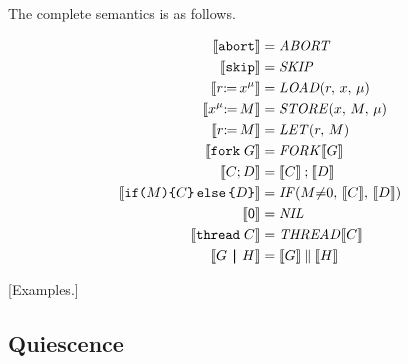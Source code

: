 The complete semantics is as follows.
\begin{scope}
  \allowdisplaybreaks
  \begin{align*}
    \sem{\ABORT} &= \sABORT
    \\
    \sem{\SKIP} &= \sSKIP
    \\
    \sem{\PR[\amode]{\aLoc}{\aReg}} &= \sLOAD[\amode]{\aReg}{\aLoc}
    \\
    \sem{\PW[\amode]{\aLoc}{\aExp}} &= \sSTORE[\amode]{\aLoc}{\aExp}
    \\
    \sem{\LET{\aReg}{\aExp}} &= \sLET{\aReg}{\aExp}
    \\
    \sem{\FORK{\aGrp}} &= \sFORK{}\sem{\aGrp}
    \\
    \sem{\aCmd \SEMI \bCmd} &= \sem{\aCmd}\sSEMI\sem{\bCmd}
    \\
    \sem{\IF{\aExp}\THEN\aCmd\ELSE\bCmd\FI} &= \sIF{\aExp{\neq}0}\sTHEN\sem{\aCmd}\sELSE\sem{\bCmd}\sFI
    \\
    \sem{\NIL} &= \sNIL
    \\
    \sem{\THREAD{\aCmd}} &= \sTHREAD{}\sem{\aCmd}
    \\
    \sem{\aGrp \PAR \bGrp} &= \sem{\aGrp}\sPAR\sem{\bGrp}
  \end{align*}
\end{scope}
[Examples.]










\subsection{Quiescence}

